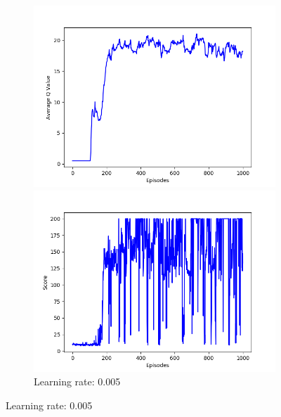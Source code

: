 \documentclass{article}
\begin{document}
\begin{figure}[!htbp]
  \begin{subfigure}{\textwidth}
    \begin{minipage}{0.5\textwidth}
      \centering
      \includegraphics[scale=0.45]{../experiments/lr_5E-3/qvalues.png}
    \end{minipage}
    \begin{minipage}{0.5\textwidth}
      \centering
      \includegraphics[scale=0.45]{../experiments/lr_5E-3/scores.png}
    \end{minipage}
    \caption{Learning rate: 0.005}
  \end{subfigure}%


\end{figure}
\end{document}
